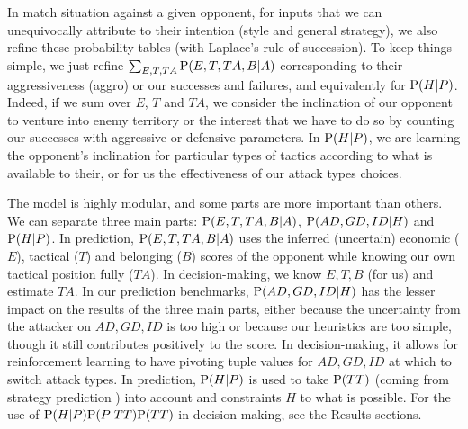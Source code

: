 In match situation against a given opponent, for inputs that we can unequivocally attribute to their intention (style and general strategy), we also refine these probability tables (with Laplace's rule of succession). To keep things simple, we just refine $\sum_{E,T,TA}\mathrm{P}(E,T,TA,B|A)$ corresponding to their aggressiveness (aggro) or our successes and failures, and equivalently for $\mathrm{P}(H|P)$. Indeed, if we sum over $E$, $T$ and $TA$, we consider the inclination of our opponent to venture into enemy territory or the interest that we have to do so by counting our successes with aggressive or defensive parameters. In $\mathrm{P}(H|P)$, we are learning the opponent's inclination for particular types of tactics according to what is available to their, or for us the effectiveness of our attack types choices.

The model is highly modular, and some parts are more important than others. We can separate three main parts: $\mathrm{P}(E,T,TA,B|A)$, $\mathrm{P}(AD,GD,ID|H)$ and $\mathrm{P}(H|P)$. In prediction, $\mathrm{P}(E,T,TA,B|A)$ uses the inferred (uncertain) economic ($E$), tactical ($T$) and belonging ($B$) scores of the opponent while knowing our own tactical position fully ($TA$). In decision-making, we know $E,T,B$ (for us) and estimate $TA$. In our prediction benchmarks, $\mathrm{P}(AD,GD,ID|H)$ has the lesser impact on the results of the three main parts, either because the uncertainty from the attacker on $AD,GD,ID$ is too high or because our heuristics are too simple, though it still contributes positively to the score. In decision-making, it allows for reinforcement learning to have pivoting tuple values for $AD,GD,ID$ at which to switch attack types. In prediction, $\mathrm{P}(H|P)$ is used to take $\mathrm{P}(TT)$ (coming from strategy prediction \cite{SYNNAEVE:StratPred}) into account and constraints $H$ to what is possible. For the use of $\mathrm{P}(H|P)\mathrm{P}(P|TT)\mathrm{P}(TT)$ in decision-making, see the Results sections.

